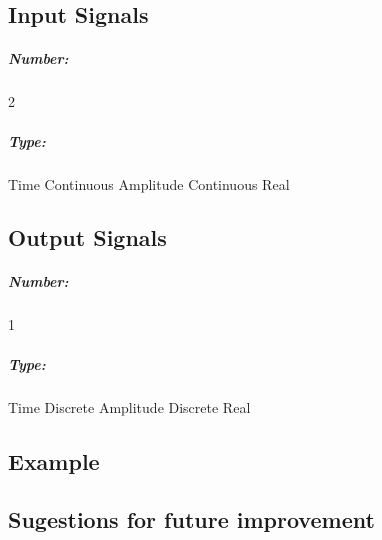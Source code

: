 \subsection*{Input Signals}

\subparagraph*{Number:} 2

\subparagraph*{Type:} Time Continuous Amplitude Continuous Real

\subsection*{Output Signals}

\subparagraph*{Number:} 1

\subparagraph*{Type:} Time Discrete Amplitude Discrete Real

\subsection*{Example}

\subsection*{Sugestions for future improvement}
